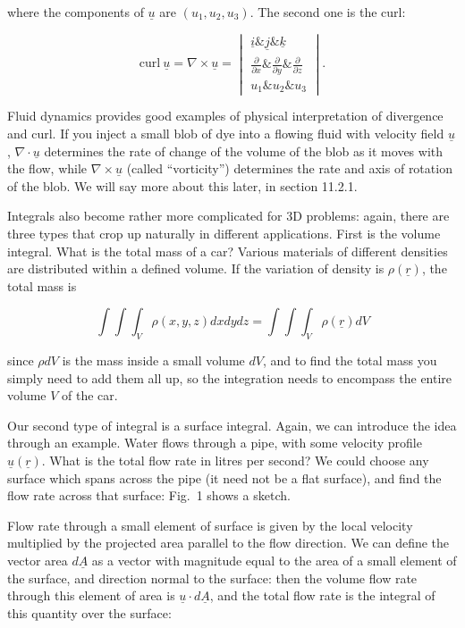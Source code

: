   where the components of $\underline{u}$ are $(u_1,u_2,u_3)$. The second one 
  is the curl: 

  $$\mathrm{curl~} \underline{u} = \nabla \times \underline{u} =\begin{vmatrix} 
  \underline{i}\&\underline{j}\&\underline{k}\\ \frac{\partial}{\partial 
  x}\&\frac{\partial}{\partial y}\&\frac{\partial}{\partial z}\\u_1\&u_2\&u_3 
  \end{vmatrix} . \tag{7}$$ 

  Fluid dynamics provides good examples of physical interpretation of 
  divergence and curl. If you inject a small blob of dye into a flowing fluid 
  with velocity field $\underline{u}$, $\nabla \cdot \underline{u}$ determines 
  the rate of change of the volume of the blob as it moves with the flow, while 
  $\nabla \times \underline{u}$ (called ``vorticity'') determines the rate and 
  axis of rotation of the blob. We will say more about this later, in section 
  11.2.1. 


  Integrals also become rather more complicated for 3D problems: again, there 
  are three types that crop up naturally in different applications. First is 
  the volume integral. What is the total mass of a car? Various materials of 
  different densities are distributed within a defined volume. If the variation 
  of density is $\rho(\underline{r})$, the total mass is 

  $$\int{\int{\int_V{\rho(x,y,z) dx}dy}dz} = 
  \int{\int{\int_V{\rho(\underline{r})}}dV} \tag{8}$$ 

  since $\rho dV$ is the mass inside a small volume $dV$, and to find the total 
  mass you simply need to add them all up, so the integration needs to 
  encompass the entire volume $V$ of the car. 

  Our second type of integral is a surface integral. Again, we can introduce 
  the idea through an example. Water flows through a pipe, with some velocity 
  profile $\underline{u}(\underline{r})$. What is the total flow rate in litres 
  per second? We could choose any surface which spans across the pipe (it need 
  not be a flat surface), and find the flow rate across that surface: Fig.\ 1 
  shows a sketch. 

  Flow rate through a small element of surface is given by the local velocity 
  multiplied by the projected area parallel to the flow direction. We can 
  define the vector area $d\underline{A}$ as a vector with magnitude equal to 
  the area of a small element of the surface, and direction normal to the 
  surface: then the volume flow rate through this element of area is 
  $\underline{u} \cdot d\underline{A}$, and the total flow rate is the integral 
  of this quantity over the surface: 

